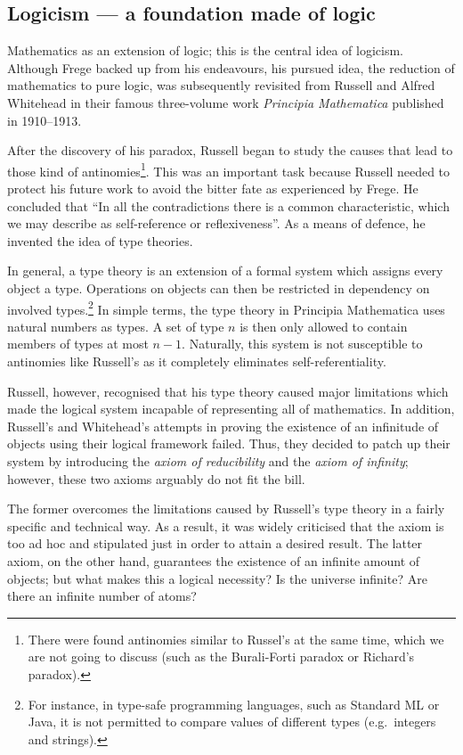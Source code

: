 \documentclass[hidelinks]{article}
\begin{document}
\subsection{Logicism --- a foundation made of logic}\label{ssec_logicism}
Mathematics as an extension of logic; this is the central idea of logicism. Although Frege backed up from his endeavours, his pursued idea, the reduction of mathematics to pure logic, was subsequently revisited from Russell and Alfred Whitehead in their famous three-volume work \textit{Principia Mathematica} published in 1910--1913.

After the discovery of his paradox, Russell began to study the causes that lead to those kind of antinomies\footnote{There were found antinomies similar to Russel's at the same time, which we are not going to discuss (such as the Burali-Forti paradox or Richard's paradox).\cite{russell_self_referentiality}}. This was an important task because Russell needed to protect his future work to avoid the bitter fate as experienced by Frege. He concluded that ``In all the contradictions there is a common characteristic, which we may describe as self-reference or reflexiveness''\cite[p. 224]{russell_self_referentiality}. As a means of defence, he invented the idea of type theories. 

In general, a type theory is an extension of a formal system which assigns every object a type. Operations on objects can then be restricted in dependency on involved types.\footnote{For instance, in type-safe programming languages, such as Standard ML or Java, it is not permitted to compare values of different types (e.g.\ integers and strings).} In simple terms, the type theory in Principia Mathematica uses natural numbers as types. A set of type $n$ is then only allowed to contain members of types at most $n-1$. Naturally, this system is not susceptible to antinomies like Russell's as it completely eliminates self-referentiality. 

Russell, however, recognised that his type theory caused major limitations which made the logical system incapable of representing all of mathematics. In addition, Russell's and Whitehead's attempts in proving the existence of an infinitude of objects using their logical framework failed. Thus, they decided to patch up their system by introducing the \textit{axiom of reducibility} and the \textit{axiom of infinity}; however, these two axioms arguably do not fit the bill.

The former overcomes the limitations caused by Russell's type theory in a fairly specific and technical way. As a result, it was widely criticised that the axiom is too ad hoc and stipulated just in order to attain a desired result.
The latter axiom, on the other hand, guarantees the existence of an infinite amount of objects; but what makes this a logical necessity? Is the universe infinite? Are there an infinite number of atoms?
\end{document}
